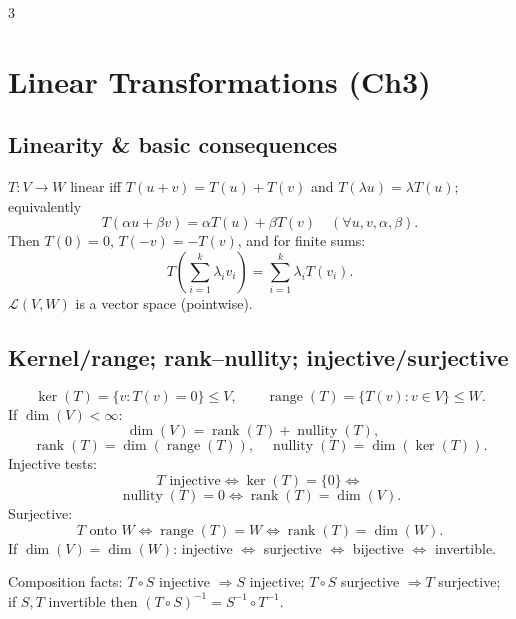 \documentclass[9pt]{article}
\newcommand{\rank}{\operatorname{rank}}
\newcommand{\nullity}{\operatorname{nullity}}
\newcommand{\Ker}{\operatorname{ker}}
\newcommand{\Range}{\operatorname{range}}
\begin{document}
\begin{multicols}{3}
\section*{Linear Transformations (Ch3)}

\subsection*{Linearity \& basic consequences}
$T:V\to W$ linear iff $T(u+v)=T(u)+T(v)$ and $T(\lambda u)=\lambda T(u)$; equivalently
\[
T(\alpha u+\beta v)=\alpha T(u)+\beta T(v)\quad(\forall u,v,\alpha,\beta).
\]
Then $T(0)=0$, $T(-v)=-T(v)$, and for finite sums:
\[
T\!\left(\sum_{i=1}^k\lambda_i v_i\right)=\sum_{i=1}^k\lambda_iT(v_i).
\]
$\mathcal{L}(V,W)$ is a vector space (pointwise).\\

\subsection*{Kernel/range; rank--nullity; injective/surjective}
\[
\Ker(T)=\{v:T(v)=0\}\le V,\qquad \Range(T)=\{T(v):v\in V\}\le W.
\]
If $\dim(V)<\infty$:
\[
\dim(V)=\rank(T)+\nullity(T),\quad 
\]
\[
\rank(T)=\dim(\Range(T)),\quad \nullity(T)=\dim(\Ker(T)).
\]
Injective tests:
\[
T\text{ injective}\iff \Ker(T)=\{0\}\iff
\]
\[
\nullity(T)=0\iff \rank(T)=\dim(V).
\]
Surjective:
\[
T\text{ onto }W\iff \Range(T)=W\iff \rank(T)=\dim(W).
\]
If $\dim(V)=\dim(W)$: injective $\iff$ surjective $\iff$ bijective $\iff$ invertible.

Composition facts: $T\circ S$ injective $\Rightarrow S$ injective; $T\circ S$ surjective $\Rightarrow T$ surjective; if $S,T$ invertible then $(T\circ S)^{-1}=S^{-1}\circ T^{-1}$.\\


\end{multicols}
\end{document}
